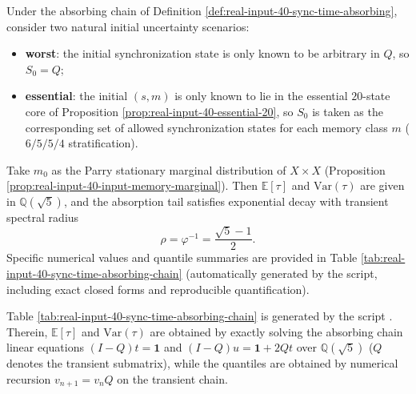 \begin{proposition}\label{prop:real-input-40-sync-time-moments}
Under the absorbing chain of Definition \ref{def:real-input-40-sync-time-absorbing}, consider two natural initial uncertainty scenarios:
\begin{itemize}
  \item \textbf{worst}: the initial synchronization state is only known to be arbitrary in \(Q\), so \(S_0=Q\);
  \item \textbf{essential}: the initial $(s,m)$ is only known to lie in the essential $20$-state core of Proposition \ref{prop:real-input-40-essential-20}, so \(S_0\) is taken as the corresponding set of allowed synchronization states for each memory class \(m\) ($6/5/5/4$ stratification).
\end{itemize}
Take \(m_0\) as the Parry stationary marginal distribution of \(X\times X\) (Proposition \ref{prop:real-input-40-input-memory-marginal}).
Then \(\mathbb{E}[\tau]\) and \(\mathrm{Var}(\tau)\) are given in \(\mathbb{Q}(\sqrt5)\), and the absorption tail satisfies exponential decay with transient spectral radius
\[
\rho=\varphi^{-1}=\frac{\sqrt5-1}{2}.
\]
Specific numerical values and quantile summaries are provided in Table \ref{tab:real-input-40-sync-time-absorbing-chain} (automatically generated by the script, including exact closed forms and reproducible quantification).
\end{proposition}



\begin{remark}\label{rem:real-input-40-sync-time-repro}
Table \ref{tab:real-input-40-sync-time-absorbing-chain} is generated by the script .
Therein, \(\mathbb{E}[\tau]\) and \(\mathrm{Var}(\tau)\) are obtained by exactly solving the absorbing chain linear equations
\(
(I-Q)t=\mathbf{1}
\)
and
\(
(I-Q)u=\mathbf{1}+2Qt
\)
over \(\mathbb{Q}(\sqrt5)\) (\(Q\) denotes the transient submatrix), while the quantiles are obtained by numerical recursion \(v_{n+1}=v_n Q\) on the transient chain.
\end{remark}
